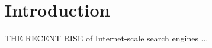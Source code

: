 \chapter{Introduction}{}
\label{sec:intro}

\lettrine[lraise=0.1, nindent=0em, slope=-.5em]{T}{HE RECENT RISE} of Internet-scale 
search engines $\ldots$